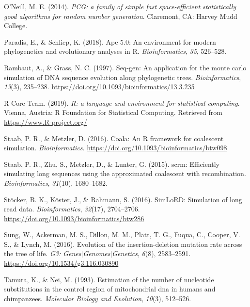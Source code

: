 \documentclass[12pt,]{article}
\begin{document}
\leavevmode\hypertarget{ref-Oneill_2014pcg}{}%
O'Neill, M. E. (2014). \emph{PCG: a family of simple fast space-efficient statistically good algorithms for random number generation}. Claremont, CA: Harvey Mudd College.

\leavevmode\hypertarget{ref-Paradis_2018}{}%
Paradis, E., \& Schliep, K. (2018). Ape 5.0: An environment for modern phylogenetics and evolutionary analyses in R. \emph{Bioinformatics}, \emph{35}, 526--528.

\leavevmode\hypertarget{ref-Rambaut_1997}{}%
Rambaut, A., \& Grass, N. C. (1997). Seq-gen: An application for the monte carlo simulation of DNA sequence evolution along phylogenetic trees. \emph{Bioinformatics}, \emph{13}(3), 235--238. \url{https://doi.org/10.1093/bioinformatics/13.3.235}

\leavevmode\hypertarget{ref-R_Core_Team_2019}{}%
R Core Team. (2019). \emph{R: a language and environment for statistical computing}. Vienna, Austria: R Foundation for Statistical Computing. Retrieved from \url{https://www.R-project.org/}

\leavevmode\hypertarget{ref-Paul_R._Staab_2016}{}%
Staab, P. R., \& Metzler, D. (2016). Coala: An R framework for coalescent simulation. \emph{Bioinformatics}. \url{https://doi.org/10.1093/bioinformatics/btw098}

\leavevmode\hypertarget{ref-Paul_R._Staab_2015}{}%
Staab, P. R., Zhu, S., Metzler, D., \& Lunter, G. (2015). scrm: Efficiently simulating long sequences using the approximated coalescent with recombination. \emph{Bioinformatics}, \emph{31}(10), 1680--1682.

\leavevmode\hypertarget{ref-St_cker_2016}{}%
Stöcker, B. K., Köster, J., \& Rahmann, S. (2016). SimLoRD: Simulation of long read data. \emph{Bioinformatics}, \emph{32}(17), 2704--2706. \url{https://doi.org/10.1093/bioinformatics/btw286}

\leavevmode\hypertarget{ref-Sung_2016}{}%
Sung, W., Ackerman, M. S., Dillon, M. M., Platt, T. G., Fuqua, C., Cooper, V. S., \& Lynch, M. (2016). Evolution of the insertion-deletion mutation rate across the tree of life. \emph{G3: Genes\(\vert\)Genomes\(\vert\)Genetics}, \emph{6}(8), 2583--2591. \url{https://doi.org/10.1534/g3.116.030890}

\leavevmode\hypertarget{ref-TN93}{}%
Tamura, K., \& Nei, M. (1993). Estimation of the number of nucleotide substitutions in the control region of mitochondrial dna in humans and chimpanzees. \emph{Molecular Biology and Evolution}, \emph{10}(3), 512--526.
\end{document}
